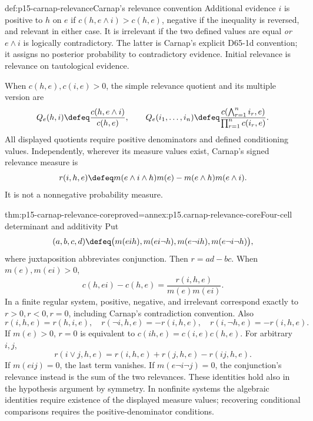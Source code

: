 \begin{hbdefinition}{def:p15-carnap-relevance}{Carnap's relevance convention}
Additional evidence \(i\) is positive to \(h\) on \(e\) if
\(c(h,e\land i)>c(h,e)\), negative if the inequality is reversed,
and relevant in either case. It is irrelevant if the two defined values
are equal \emph{or} \(e\land i\) is logically contradictory.
The latter is Carnap's explicit D65-1d convention; it assigns no
posterior probability to contradictory evidence. Initial relevance is
relevance on tautological evidence.

When \(c(h,e),c(i,e)>0\), the simple relevance quotient and its
multiple version are
\[
 Q_e(h,i)\defeq\frac{c(h,e\land i)}{c(h,e)},\qquad
 Q_e(i_1,\ldots,i_n)\defeq
 \frac{c(\bigwedge_{r=1}^n i_r,e)}{\prod_{r=1}^n c(i_r,e)}.
\]
All displayed quotients require positive denominators and defined
conditioning values. Independently, wherever its measure values exist,
Carnap's signed relevance measure is
\[
 r(i,h,e)\defeq
 m(e\land i\land h)m(e)-m(e\land h)m(e\land i).
\]
It is not a nonnegative probability measure.
\end{hbdefinition}

\begin{hbtheorem}{thm:p15-carnap-relevance-core}{proved=annex:p15.carnap-relevance-core}{Four-cell determinant and additivity}
Put
\[
 (a,b,c,d)\defeq
 \bigl(m(eih),m(ei\neg h),m(e\neg i h),m(e\neg i\neg h)\bigr),
\]
where juxtaposition abbreviates conjunction. Then \(r=ad-bc\).
When \(m(e),m(ei)>0\),
\[
 c(h,ei)-c(h,e)=\frac{r(i,h,e)}{m(e)m(ei)}.
\]
In a finite regular system, positive, negative, and irrelevant correspond
exactly to \(r>0,r<0,r=0\), including Carnap's contradiction
convention. Also
\[
 r(i,h,e)=r(h,i,e),\quad
 r(\neg i,h,e)=-r(i,h,e),\quad
 r(i,\neg h,e)=-r(i,h,e).
\]
If \(m(e)>0\), \(r=0\) is equivalent to
\(c(ih,e)=c(i,e)c(h,e)\).
For arbitrary \(i,j\),
\[
 r(i\lor j,h,e)=r(i,h,e)+r(j,h,e)-r(ij,h,e).
\]
If \(m(eij)=0\), the last term vanishes. If
\(m(e\neg i\neg j)=0\), the conjunction's relevance instead is
the sum of the two relevances. These identities hold also in the
hypothesis argument by symmetry. In nonfinite systems the algebraic
identities require existence of the displayed measure values; recovering
conditional comparisons requires the positive-denominator conditions.
\end{hbtheorem}

